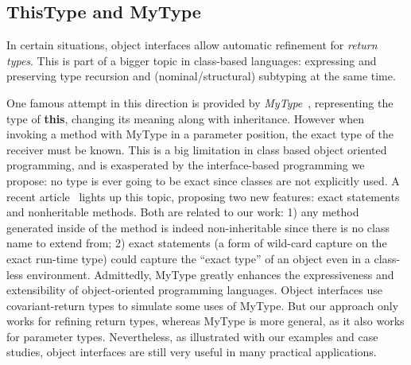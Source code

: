 % 

\subsection{ThisType and MyType}

In certain situations, object interfaces allow automatic refinement for \emph{return
types}. This is part of a bigger topic in class-based languages: expressing and
preserving type recursion and (nominal/structural) subtyping at the same time.

One famous attempt in this direction is provided by
\emph{MyType}~\cite{bruce1994paradigmatic}, representing the type of
\textbf{this}, changing its meaning along with inheritance. However when
invoking a method with MyType in a parameter position, the exact type of the
receiver must be known.  This is a big limitation in class based object oriented
programming, and is exasperated by the interface-based programming we propose: no
type is ever going to be exact since classes are not explicitly used. A recent
article~\cite{Saito2013933} lights up this topic, proposing two
new features: exact statements and nonheritable methods. Both are
related to our work: 1) any method generated inside of the \Q@of@ method is indeed
non-inheritable since there is no class name to extend from; 2) exact
statements (a form of wild-card capture on the exact run-time type) could
capture the ``exact type'' of an object even in a class-less
environment.
Admittedly, MyType greatly enhances the expressiveness and extensibility of
object-oriented programming languages. Object interfaces use covariant-return types to
simulate some uses of MyType. But our approach only works for refining
return types, whereas MyType is more general, as it also works for
parameter types. Nevertheless, as illustrated with our examples and
case studies, object interfaces are still very useful in many
practical applications.


